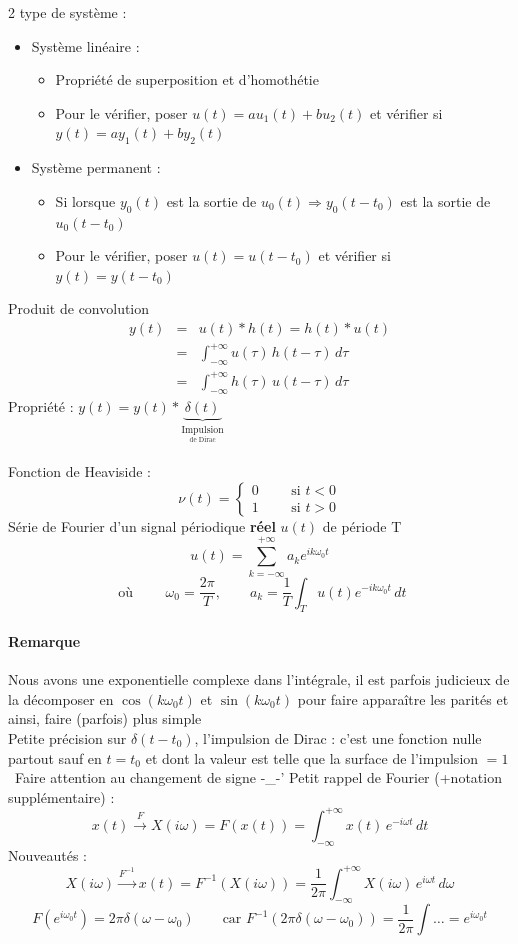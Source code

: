 2 type de système :\begin{itemize}
\item Système linéaire : \begin{itemize}
\item Propriété de superposition et d’homothétie
\item Pour le vérifier, poser $u(t)=au_1(t)+bu_2(t)$ et vérifier si $y(t) = ay_1(t)+by_2(t)$
\end{itemize}
\item Système permanent : \begin{itemize}
\item Si lorsque $y_0(t)$ est la sortie de $u_0(t)\Rightarrow y_0(t-t_0)$ est la sortie de $u_0(t-t_0)$
\item Pour le vérifier, poser $u(t)=u(t-t_0)$ et vérifier si $y(t)=y(t-t_0)$
\end{itemize}
\end{itemize}
Produit de convolution \begin{eqnarray}
y(t) &=& u(t)*h(t)=h(t)*u(t)\\
&=& \int_{-\infty}^{+\infty} u(\tau)\,h(t-\tau)\,d\tau\\
&=& \int_{-\infty}^{+\infty} h(\tau)\,u(t-\tau)\,d\tau
\end{eqnarray}
Propriété : $y(t)=y(t)*\underbrace{\delta(t)}_{\underset{\text{de Dirac}}{\text{Impulsion}}}$\\\\
Fonction de Heaviside : $$\nu(t)=\left\{\begin{array}{l}
0 \qquad \text{ si } t<0\\
1 \qquad \text{ si } t>0
\end{array}\right.$$ 
Série de Fourier d'un signal périodique \textbf{réel} $u(t)$ de période T
$$u(t)=\sum_{k=-\infty}^{+\infty}a_ke^{ik\omega_0t}$$ 
$$\text{ où }\qquad\omega_0=\frac{2\pi}{T},\qquad a_k=\frac{1}{T}\int_Tu(t)e^{-ik\omega_0t}\,dt $$
\paragraph{Remarque} Nous avons une exponentielle complexe dans l'intégrale, il est parfois judicieux de la décomposer en $\cos(k\omega_0t)$ et $\sin(k\omega_0t)$ pour faire apparaître les parités et ainsi, faire (parfois) plus simple\\
Petite précision sur $\delta(t-t_0)$, l'impulsion de Dirac : c'est une fonction nulle partout sauf en $t=t_0$ et dont la valeur est telle que la surface de l'impulsion $=1$\\
\danger\ Faire attention au changement de signe -\_-'
Petit rappel de Fourier (+notation supplémentaire) :
$$x(t)\overset{F}{\rightarrow}X(i\omega)=F(x(t))=\int_{-\infty}^{+\infty}x(t)\,e^{-i\omega t}\, dt $$
Nouveautés : $$X(i\omega)\overset{F^{-1}}{\rightarrow} x(t)=F^{-1}(X(i\omega))=\frac{1}{2\pi}\int_{-\infty}^{+\infty}X(i\omega)\,e^{i\omega t}\,d\omega$$
$$F\left(e^{i\omega_0t}\right) = 2\pi\delta(\omega-\omega_0)\qquad\text{car }F^{-1}(2\pi\delta(\omega-\omega_0)) = \frac{1}{2\pi}\int\dots=e^{i\omega_0t} $$
